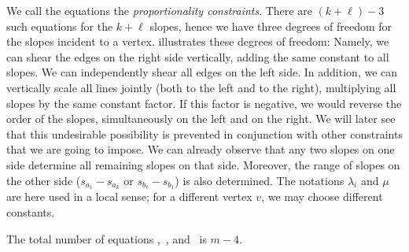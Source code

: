 We call the equations
\thetag{\ref{eq:proportion}--\ref{eq:proportion2}} the
\emph{proportionality constraints}.
There are $(k+\ell)-3$ such equations for the $k+\ell$ slopes, hence
we have three degrees of freedom for the slopes incident to a vertex.
 illustrates these  degrees of freedom:
Namely, we can shear the edges on the right side vertically, adding the same constant to all
slopes. We can independently shear all edges on the left side.
In addition, we can vertically scale {all} lines jointly (both to
the left and to the right), multiplying all slopes by the same constant factor.
If this factor is negative, we would reverse the order of the
slopes, simultaneously on the left and on the right. We will later see
that this undesirable possibility is prevented in conjunction with
other constraints that we are going to impose. We can already observe
that any two slopes on one side determine all remaining slopes on that side. Moreover, the range of slopes on the other side ($s_{a_1}-s_{a_{k}}$ or $s_{b_{\ell}}-s_{b_1}$) is also determined.
%
The notations $\lambda_i$ and $\mu$ are here used in a local sense;
for a different vertex $v$, we may choose different constants.
\begin{lem} \label{le:number-of-equations}
The total number of equations \thetag{\ref{eq:slope0}},~\thetag{\ref{eq:proportion}}, and~\thetag{\ref{eq:proportion2}} is $m-4$.
\end{lem} 
